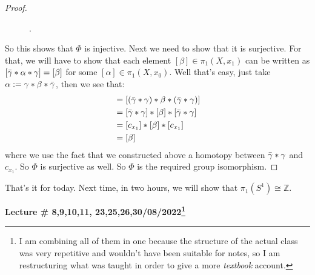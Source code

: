 \documentclass[letterpaper,11pt,twoside]{article}
\theoremstyle{definition}
\theoremstyle{definition}
\theoremstyle{definition}
\theoremstyle{definition}
\theoremstyle{definition}
\theoremstyle{definition}
\theoremstyle{remark}
\theoremstyle{definition}
\newcommand{\isom}{\cong}
\newcommand{\newlecture}[2]{\begin{center}
    \textbf{Lecture \# #1, #2}
\end{center}}
\begin{document}
\begin{proof}
\begin{figure}[h!]
\begin{tikzpicture}[x=0.75pt,y=0.75pt,yscale=-1,xscale=1]
\end{tikzpicture}.
    \end{figure}
    So this shows that $\Phi$ is injective. Next we need to show that it is surjective. For that, we will have to show that each element  $[\beta] \in \pi_1(X,x_1)$ can be written as $[\Bar{\gamma} *\alpha * \gamma] = [\beta]$ for some $[\alpha]\in \pi_1(X,x_0)$. Well that's easy, just take $\alpha := \gamma * \beta *\Bar{\gamma}$, then we see that:
    \begin{align*}
        [\Bar{\gamma}*(\gamma * \beta * \Bar{\gamma}) *\gamma]&=[(\Bar{\gamma}*\gamma) * \beta * (\Bar{\gamma} *\gamma)]\\
        &=[\Bar{\gamma}*\gamma]*[\beta]*[\Bar{\gamma}*\gamma]\\
        &= [c_{x_1}] *[\beta]*[c_{x_1}]\\
        &= [\beta]
    \end{align*}
    where we use the fact that we constructed above a homotopy between $\Bar{\gamma}*\gamma$ and $c_{x_1}$. So $\Phi$ is surjective as well. So $\Phi$ is the required group isomorphism. 
\end{proof}
That's it for today. Next time, in two hours, we will show that $\pi_1(S^1) \isom \mathbb{Z}$.
\newlecture{8,9,10,11}{23,25,26,30/08/2022\footnote{I am combining all of them in one because the structure of the actual class was very repetitive and wouldn't have been suitable for notes, so I am restructuring what was taught in order to give a more \textit{textbook} account.}}
\end{document}
